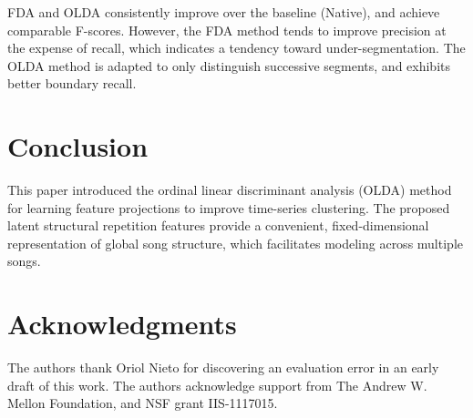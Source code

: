 \documentclass{article}
\begin{document}
FDA and OLDA consistently improve over the baseline (Native), and achieve comparable F-scores. 
However, the FDA method tends to improve precision at the expense of recall, which indicates a tendency toward under-segmentation.
The OLDA method is adapted to only distinguish successive segments, and exhibits better boundary recall.

\section{Conclusion}
\label{sec:conclusion}
This paper introduced the ordinal linear discriminant analysis (OLDA) method for learning feature projections to improve time-series clustering.
The proposed latent structural repetition features provide a convenient, fixed-dimensional representation of global song structure, which 
facilitates modeling across multiple songs.

\section{Acknowledgments}
The authors thank Oriol Nieto for discovering an evaluation error in an early draft of this work.
The authors acknowledge support from The Andrew W. Mellon Foundation, and NSF grant IIS-1117015.



\end{document}
